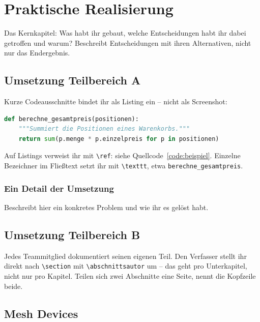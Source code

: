 \chapter{Praktische Realisierung}

Das Kernkapitel: Was habt ihr gebaut, welche Entscheidungen habt ihr dabei
getroffen und warum? Beschreibt Entscheidungen mit ihren Alternativen, nicht
nur das Endergebnis.

\section{Umsetzung Teilbereich A}

Kurze Codeausschnitte bindet ihr als Listing ein -- nicht als Screenshot:

\begin{lstlisting}[language=Python, caption={Beispiel für ein Quellcode-Listing}, label=code:beispiel]
def berechne_gesamtpreis(positionen):
    """Summiert die Positionen eines Warenkorbs."""
    return sum(p.menge * p.einzelpreis for p in positionen)
\end{lstlisting}

Auf Listings verweist ihr mit \verb|\ref|: siehe Quellcode~\ref{code:beispiel}.
Einzelne Bezeichner im Fließtext setzt ihr mit \verb|\texttt|, etwa
\texttt{berechne\_gesamtpreis}.

\subsection{Ein Detail der Umsetzung}

Beschreibt hier ein konkretes Problem und wie ihr es gelöst habt.

\section{Umsetzung Teilbereich B}

Jedes Teammitglied dokumentiert seinen eigenen Teil. Den Verfasser stellt ihr
direkt nach \verb|\section| mit \verb|\abschnittsautor| um -- das geht pro
Unterkapitel, nicht nur pro Kapitel. Teilen sich zwei Abschnitte eine Seite,
nennt die Kopfzeile beide.

\pagebreak
\section{Mesh Devices} 
